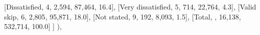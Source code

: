 \documentclass[
  11pt,
  a4paper,
]{article}
\newenvironment{Shaded}{\begin{snugshade}}{\end{snugshade}}
\newcommand{\NormalTok}[1]{\textcolor[rgb]{0.00,0.23,0.31}{#1}}
\newcommand{\StringTok}[1]{\textcolor[rgb]{0.13,0.47,0.30}{#1}}
\begin{document}
\begin{Shaded}
\begin{Highlighting}[]
\NormalTok{                    [}\StringTok{\textquotesingle{}Dissatisfied\textquotesingle{}}\NormalTok{, }\StringTok{\textquotesingle{}4\textquotesingle{}}\NormalTok{, }\StringTok{\textquotesingle{}2,594\textquotesingle{}}\NormalTok{, }\StringTok{\textquotesingle{}87,464\textquotesingle{}}\NormalTok{, }\StringTok{\textquotesingle{}16.4\textquotesingle{}}\NormalTok{],}
\NormalTok{                    [}\StringTok{\textquotesingle{}Very dissatisfied\textquotesingle{}}\NormalTok{, }\StringTok{\textquotesingle{}5\textquotesingle{}}\NormalTok{, }\StringTok{\textquotesingle{}714\textquotesingle{}}\NormalTok{, }\StringTok{\textquotesingle{}22,764\textquotesingle{}}\NormalTok{, }\StringTok{\textquotesingle{}4.3\textquotesingle{}}\NormalTok{],}
\NormalTok{                    [}\StringTok{\textquotesingle{}Valid skip\textquotesingle{}}\NormalTok{, }\StringTok{\textquotesingle{}6\textquotesingle{}}\NormalTok{, }\StringTok{\textquotesingle{}2,805\textquotesingle{}}\NormalTok{, }\StringTok{\textquotesingle{}95,871\textquotesingle{}}\NormalTok{, }\StringTok{\textquotesingle{}18.0\textquotesingle{}}\NormalTok{],}
\NormalTok{                    [}\StringTok{\textquotesingle{}Not stated\textquotesingle{}}\NormalTok{, }\StringTok{\textquotesingle{}9\textquotesingle{}}\NormalTok{, }\StringTok{\textquotesingle{}192\textquotesingle{}}\NormalTok{, }\StringTok{\textquotesingle{}8,093\textquotesingle{}}\NormalTok{, }\StringTok{\textquotesingle{}1.5\textquotesingle{}}\NormalTok{],}
\NormalTok{                    [}\StringTok{\textquotesingle{}Total\textquotesingle{}}\NormalTok{, }\StringTok{\textquotesingle{}\textquotesingle{}}\NormalTok{, }\StringTok{\textquotesingle{}16,138\textquotesingle{}}\NormalTok{, }\StringTok{\textquotesingle{}532,714\textquotesingle{}}\NormalTok{, }\StringTok{\textquotesingle{}100.0\textquotesingle{}}\NormalTok{]}
\NormalTok{                ]}
\NormalTok{            ),}
            

\end{Highlighting}
\end{Shaded}
\end{document}
